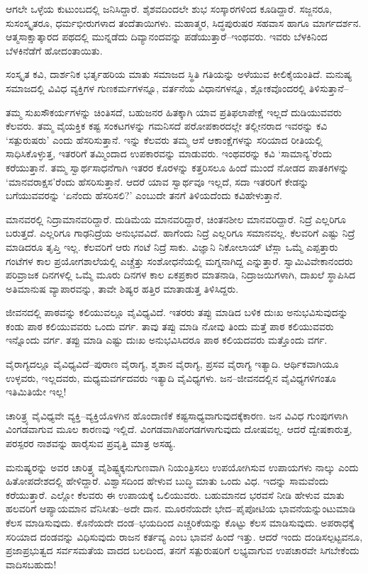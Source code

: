 ಆಗಲೇ ಒಳ್ಳೆಯ ಕುಟುಂಬದಲ್ಲಿ ಜನಿಸಿದ್ದಾರೆ. ಶೈಶವದಿಂದಲೇ ಶುಭ ಸಂಸ್ಕಾರಗಳಿಂದ ಕೂಡಿದ್ದಾರೆ. ಸಜ್ಜನರೂ, ಸುಸಂಸ್ಕೃತರೂ, ಧರ್ಮಭೀರುಗಳಾದ ತಂದೆತಾಯಿಗಳು. ಮಹಾತ್ಮರ, ಸಿದ್ಧಪುರುಷರ ಸಹವಾಸ ಹಾಗೂ ಮಾರ್ಗದರ್ಶನ. ಆತ್ಮಸಾಕ್ಷಾತ್ಕಾರದ ಪಥದಲ್ಲಿ ಮುನ್ನಡೆದು ದಿವ್ಯಾನಂದವನ್ನು ಪಡೆಯುತ್ತಾರೆ–ಇಂಥವರು. ಇವರು ಬೆಳಕಿನಿಂದ ಬೆಳಕಿನೆಡೆಗೆ ಹೋದಂತಾಯಿತು.

ಸಂಸ್ಕೃತ ಕವಿ, ದಾರ್ಶನಿಕ ಭರ್ತೃಹರಿಯ ಮಾತು ಸಮಾಜದ ಸ್ಥಿತಿ ಗತಿಯನ್ನು ಅಳೆಯುವ ಕೀಲಿಕೈಯಂತಿದೆ. ಮನುಷ್ಯ ಸಮಾಜದಲ್ಲಿ ವಿವಿಧ ವ್ಯಕ್ತಿಗಳ ಗುಣಕರ್ಮಗಳನ್ನೂ, ವರ್ತನೆಯ ವಿಧಾನಗಳನ್ನೂ, ಶ್ಲೋಕವೊಂದರಲ್ಲಿ ತಿಳಿಸುತ್ತಾನೆ–

ತಮ್ಮ ಸುಖಸೌಕರ್ಯಗಳನ್ನು ಚಿಂತಿಸದೆ, ಬಹುಜನರ ಹಿತಕ್ಕಾಗಿ ಯಾವ ಪ್ರತಿಫಲಾಪೇಕ್ಷೆ ಇಲ್ಲದೆ ದುಡಿಯುವವರು ಕೆಲವರು. ತಮ್ಮ ವೈಯಕ್ತಿಕ ಕಷ್ಟ ಸಂಕಟಗಳನ್ನು ಗಮನಿಸದೆ ಪರೋಪ\-ಕಾರದಲ್ಲೇ ತಲ್ಲೀನರಾದ ಇವರನ್ನು ಕವಿ ‘ಸತ್ಪುರುಷರು’ ಎಂದು ಹೆಸರಿಸುತ್ತಾನೆ. ಇನ್ನು ಕೆಲವರು ತಮ್ಮ ಆಸೆ ಆಕಾಂಕ್ಷೆಗಳನ್ನು ಸರಿಯಾದ ರೀತಿಯಲ್ಲಿ ಸಾಧಿಸಿಕೊಳ್ಳುತ್ತ, ಇತರರಿಗೆ ತಮ್ಮಿಂದಾದ ಉಪಕಾರವನ್ನು ಮಾಡುವರು. ಇಂಥವರನ್ನು ಕವಿ ‘ಸಾಮಾನ್ಯ’ರೆಂದು ಕರೆಯುತ್ತಾನೆ. ತಮ್ಮ ಸ್ವಾರ್ಥಸಾಧನೆಗಾಗಿ ಇತರರ ಕೊರಳನ್ನು ಕತ್ತರಿಸಲೂ ಹಿಂದೆ ಮುಂದೆ ನೋಡದ ಪಾತಕಿಗಳನ್ನು ‘ಮಾನವರಾಕ್ಷಸ’ರೆಂದು ಹೆಸರಿಸುತ್ತಾನೆ. ಆದರೆ ಯಾವ ಸ್ವಾರ್ಥವೂ ಇಲ್ಲದೆ, ಸದಾ ಇತರರಿಗೆ ಕೇಡನ್ನು ಬಗೆಯುವವರನ್ನು ‘ಏನೆಂದು ಹೆಸರಿಸಲಿ?’ ಎಂಬುದೇ ತನಗೆ ತಿಳಿಯದೆಂದು ಕವಿ\break ಹೇಳುತ್ತಾನೆ.

ಮಾನವರಲ್ಲಿ ನಿದ್ರಾಮಾನವರಿದ್ದಾರೆ. ದುಡಿಮೆಯ ಮಾನವರಿದ್ದಾರೆ, ಚಿಂತನಶೀಲ ಮಾನವ\-ರಿದ್ದಾರೆ. ನಿದ್ರೆ ಎಲ್ಲರಿಗೂ ಬರುತ್ತದೆ. ಎಲ್ಲರಿಗೂ ಗಾಢನಿದ್ರೆಯ ಅನುಭವವಿದೆ. ಹಾಗೆಂದು ನಿದ್ರೆ ಎಲ್ಲರಿಗೂ ಸಮಾನವಲ್ಲ. ಕೆಲವರಿಗೆ ಎಷ್ಟು ನಿದ್ರೆ ಮಾಡಿದರೂ ತೃಪ್ತಿ ಇಲ್ಲ. ಕೆಲವರಿಗೆ ಆರು ಗಂಟೆ ನಿದ್ರೆ ಸಾಕು. ವಿಜ್ಞಾನಿ ನಿಕೋಲಾಯ್ ಟೆಸ್ಲಾ ಒಮ್ಮೆ ಎಪ್ಪತ್ತಾರು ಗಂಟೆಗಳ ಕಾಲ ಪ್ರಯೋಗಶಾಲೆಯಲ್ಲಿ ಎಚ್ಚೆತ್ತು ಸಂಶೋಧನೆಯಲ್ಲಿ ಮಗ್ನನಾಗಿದ್ದ ಎನ್ನುತ್ತಾರೆ. ಸ್ವಾಮಿ\break ವಿವೇಕಾನಂದರು ಪರಿವ್ರಾಜಕ ದಿನಗಳಲ್ಲಿ ಒಮ್ಮೆ ಮೂರು ದಿನಗಳ ಕಾಲ ಏಕಪ್ರಕಾರ ಮಾತನಾಡಿ, ನಿದ್ರಾಜಯಿಗಳಾಗಿ, ದಾಖಲೆ ಸ್ಥಾಪಿಸಿದ ಅತಿಮಾನುಷ ವ್ಯಾಪಾರವನ್ನು, ತಾವೇ ಶಿಷ್ಯರ ಹತ್ತಿರ ಮಾತಾಡುತ್ತ ತಿಳಿಸಿದ್ದರು.

ಜೀವನದಲ್ಲಿ ಪಾಠವನ್ನು ಕಲಿಯುವಲ್ಲೂ ವೈವಿಧ್ಯವಿದೆ. ಇತರರು ತಪ್ಪು ಮಾಡಿದ ಬಳಿಕ ದುಃಖ ಅನುಭವಿಸುವುದನ್ನು ಕಂಡು ಪಾಠ ಕಲಿಯುವವರು ಒಂದು ವರ್ಗ. ತಾವು ತಪ್ಪು ಮಾಡಿ ನೋವು ತಿಂದು ಮತ್ತೆ ಪಾಠ ಕಲಿಯುವವರು ಇನ್ನೊಂದು ವರ್ಗ. ತಪ್ಪು ಮಾಡಿ ಎಷ್ಟು ದುಃಖ ಅನುಭವಿಸಿದರೂ ಪಾಠ ಕಲಿಯದವರು ಮತ್ತೊಂದು ವರ್ಗ.

ವೈರಾಗ್ಯದಲ್ಲೂ ವೈವಿಧ್ಯವಿದೆ–ಪುರಾಣ ವೈರಾಗ್ಯ, ಶ್ಮಶಾನ ವೈರಾಗ್ಯ, ಪ್ರಸವ ವೈರಾಗ್ಯ ಇತ್ಯಾದಿ. ಆರ್ಥಿಕವಾಗಿಯೂ ಉಳ್ಳವರು, ಇಲ್ಲದವರು, ಮಧ್ಯಮವರ್ಗದವರು ಇತ್ಯಾದಿ ವೈವಿಧ್ಯಗಳು. ಜನ–ಜೀವನದಲ್ಲಿನ ವೈವಿಧ್ಯಗಳಿಗಂತೂ ಇತಿಮಿತಿಯೇ ಇಲ್ಲ!

ಚಾರಿತ್ರ್ಯ ವೈವಿಧ್ಯವೇ ವ್ಯಕ್ತಿ–ವ್ಯಕ್ತಿಯೊಳಗಿನ ಹೊಂದಾಣಿಕೆ ಕಷ್ಟಸಾಧ್ಯವಾಗುವುದಕ್ಕೆ\break ಕಾರಣ. ಜನ ವಿವಿಧ ಗುಂಪುಗಳಾಗಿ ವಿಂಗಡವಾಗುವ ಮೂಲ ಕಾರಣವು ಇಲ್ಲಿದೆ. ವಿಂಗಡವಾಗಿ\break ಪಂಗಡ\-ಗಳಾಗು\-ವುದು ದೋಷವಲ್ಲ. ಆದರೆ ದ್ವೇಷಕಾರುತ್ತ, ಪರಸ್ಪರರ ನಾಶವನ್ನು ಹಾರೈಸುವ ಪ್ರವೃತ್ತಿ ಮಾತ್ರ ಅಸಹ್ಯ.

ಮನುಷ್ಯರನ್ನು ಅವರ ಚಾರಿತ್ರ್ಯ ವೈಶಿಷ್ಟ್ಯಕ್ಕನುಗುಣವಾಗಿ ನಿಯಂತ್ರಿಸಲು ಉಪಯೋಗಿಸುವ ಉಪಾಯಗಳು ನಾಲ್ಕು ಎಂದು ಹಿತೋಪದೇಶದಲ್ಲಿ ಹೇಳಿದ್ದಾರೆ. ವಿಶ್ವಾಸದಿಂದ ಹೇಳುವ ಬುದ್ಧಿ ಮಾತು ಒಂದು ವಿಧ. ಇದನ್ನು ಸಾಮವೆಂದು ಕರೆಯುತ್ತಾರೆ. ಎಲ್ಲೋ ಕೆಲವರು ಈ ಉಪಾಯಕ್ಕೆ ಒಲಿಯುವರು. ಬಹುಮಾನದ ಭರವಸೆ ನೀಡಿ ಹೇಳುವ ಮಾತು ಹಲವರಿಗೆ ಆಪ್ಯಾಯಮಾನ ವೆನಿಸೀತು–ಅದೇ ದಾನ. ಮೂರನೆಯದೇ ಭೇದ–ಪೈಪೋಟಿಯ ಭಾವನೆಯನ್ನುಂಟುಮಾಡಿ ಕೆಲಸ ಮಾಡಿಸುವುದು. ಕೊನೆಯದೇ ದಂಡ–ಭಯದಿಂದ ಎಚ್ಚರಿಕೆಯನ್ನು ಕೊಟ್ಟು ಕೆಲಸ ಮಾಡಿಸುವುದು. ಅಪರಾಧಕ್ಕೆ ಸರಿಯಾದ ದಂಡವನ್ನು ವಿಧಿಸುವುದು ರಾಜನ ಕರ್ತವ್ಯ ಎಂಬ ಭಾವನೆ ಹಿಂದೆ ಇತ್ತು. ಆದರೆ ಇಂದು ದಂಡಿಸಲ್ಪಟ್ಟವನೂ, ಪ್ರಜಾಪ್ರಭುತ್ವದ ಸರ್ವಸಮತೆಯ ವಾದದ ಬಲದಿಂದ, ತನಗೆ ಸತ್ಪುರುಷರಿಗೆ ಲಭ್ಯವಾಗುವ ಉಪಚಾರವೇ ಸಿಗಬೇಕೆಂದು ವಾದಿಸಬಹುದು!

